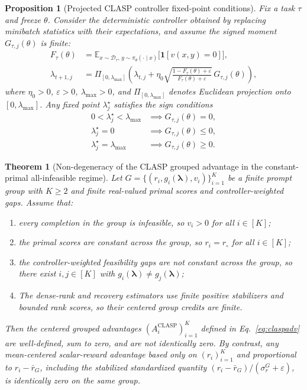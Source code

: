 \documentclass{article}
\newtheorem{theorem}{Theorem}
\newtheorem{proposition}{Proposition}
\theoremstyle{remark}
\begin{document}
\begin{proposition}[Projected CLASP controller fixed-point conditions]
\label{prop:controller-fixed-point}
Fix a task \(\tau\) and freeze \(\theta\). Consider the deterministic controller obtained by replacing minibatch statistics with their expectations, and assume the signed moment \(G_{\tau,j}(\theta)\) is finite:
\begin{align}
F_\tau(\theta) &= \mathbb{E}_{x \sim \mathcal D_\tau,\, y \sim \pi_\theta(\cdot\mid x)}\bigl[\mathbf{1}[v(x,y) = 0]\bigr], \\
\lambda_{t+1,j}
&=
\Pi_{[0,\lambda_{\max}]}
\left(
\lambda_{t,j}
+
\eta_0 \sqrt{\frac{1-F_\tau(\theta)+\varepsilon}{F_\tau(\theta)+\varepsilon}}\, G_{\tau,j}(\theta)
\right),
\end{align}
where \(\eta_0>0\), \(\varepsilon>0\), \(\lambda_{\max}>0\), and \(\Pi_{[0,\lambda_{\max}]}\) denotes Euclidean projection onto \([0,\lambda_{\max}]\). Any fixed point \(\lambda_j^\star\) satisfies the sign conditions
\begin{align}
0 < \lambda_j^{\star} < \lambda_{\max}
&\implies
G_{\tau,j}(\theta)=0, \\
\lambda_j^{\star} = 0
&\implies
G_{\tau,j}(\theta)\le 0, \\
\lambda_j^{\star} = \lambda_{\max}
&\implies
G_{\tau,j}(\theta)\ge 0.
\end{align}
\end{proposition}

\begin{theorem}[Non-degeneracy of the CLASP grouped advantage in the constant-primal all-infeasible regime]
\label{thm:clasp-nondegenerate}
Let \(G=\{(r_i,g_i(\boldsymbol{\lambda}),v_i)\}_{i=1}^K\) be a finite prompt group with \(K\ge 2\) and finite real-valued primal scores and controller-weighted gaps. Assume that:
\begin{enumerate}
\item every completion in the group is infeasible, so \(v_i>0\) for all \(i\in[K]\);
\item the primal scores are constant across the group, so \(r_i=r_\circ\) for all \(i\in[K]\);
\item the controller-weighted feasibility gaps are not constant across the group, so there exist \(i,j\in[K]\) with \(g_i(\boldsymbol{\lambda})\neq g_j(\boldsymbol{\lambda})\);
\item The dense-rank and recovery estimators use finite positive stabilizers and bounded rank scores, so their centered group credits are finite.
\end{enumerate}
Then the centered grouped advantages \((A_i^{\mathrm{CLASP}})_{i=1}^K\) defined in Eq.~\eqref{eq:claspadv} are well-defined, sum to zero, and are not identically zero. By contrast, any mean-centered scalar-reward advantage based only on \((r_i)_{i=1}^K\) and proportional to \(r_i-\bar r_G\), including the stabilized standardized quantity \((r_i-\bar r_G)/(\sigma_r^G+\varepsilon)\), is identically zero on the same group.
\end{theorem}
\end{document}
